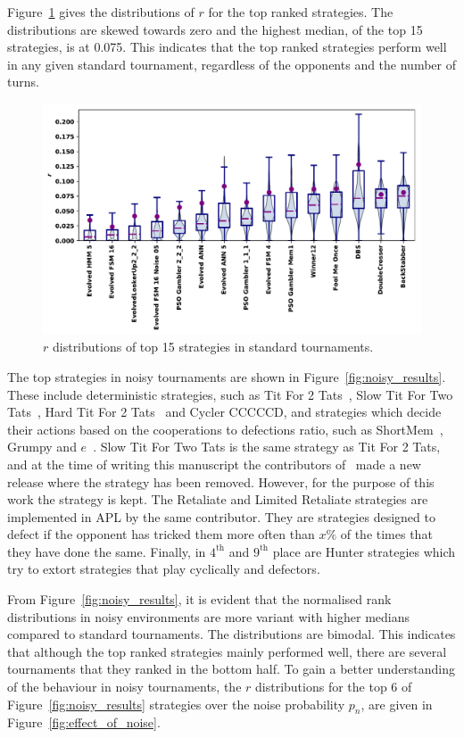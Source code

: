 \documentclass{article}
\begin{document}
Figure~\ref{fig:std_results} gives the distributions of $r$ for the top
ranked strategies. The distributions are skewed towards zero and the highest
median, of the top 15 strategies, is at 0.075. This indicates that the top ranked
strategies perform well in any given standard tournament, regardless of the opponents and
the number of turns.

\begin{figure}[!htbp]
    \centering
    \includegraphics[width=.7\textwidth]{../images/performance_standard.pdf}
    \caption{$r$ distributions of top 15 strategies in standard tournaments.}\label{fig:std_results}
\end{figure}

The top strategies in noisy tournaments are shown in Figure~\ref{fig:noisy_results}. These include deterministic strategies, such
as Tit For 2 Tats~\cite{Axelrod1980b}, Slow Tit For Two Tats~\cite{axelrodproject}, Hard Tit For 2 Tats~\cite{Stewart2012}
and Cycler CCCCCD, and strategies which decide their actions based on the
cooperations to defections ratio, such as ShortMem~\cite{Carvalho2013}, Grumpy
and $e$~\cite{axelrodproject}. Slow Tit For Two Tats is the same strategy as 
Tit For 2 Tats, and at the time of writing this manuscript the
contributors of~\cite{axelrodproject} made a new release where the strategy
has been removed. However, for the purpose of this work the strategy is kept.
The Retaliate and
Limited Retaliate strategies are implemented in APL by the
same contributor. They are strategies designed to defect if the opponent has
tricked them more often than \(x\%\) of the times that they have
done the same. Finally, in $4^{\text{th}}$ and $9^{\text{th}}$ place are Hunter
strategies which try to extort strategies that play cyclically
and defectors.

From Figure~\ref{fig:noisy_results}, it is evident that the normalised rank
distributions in noisy environments are more variant with higher medians
compared to standard tournaments. The distributions are bimodal. This indicates
that although the top ranked strategies mainly performed well, there are several
tournaments that they ranked in the bottom half. To gain a better understanding
of the behaviour in noisy tournaments, the \(r\) distributions for the top 6
of Figure~\ref{fig:noisy_results} strategies over the noise probability \(p_n\),
are given in Figure~\ref{fig:effect_of_noise}.
\end{document}
